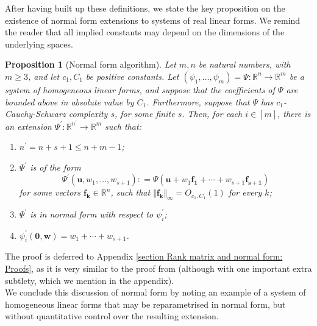 \documentclass[12pt,a4paper,twoside,reqno]{amsart}
\newtheorem{Proposition}[Theorem]{Proposition}
\numberwithin{equation}{section}
\begin{document}
After having built up these definitions, we state the key proposition on the existence of normal form extensions to systems of real linear forms. We remind the reader that all implied constants may depend on the dimensions of the underlying spaces. 

\begin{Proposition}[Normal form algorithm]
\label{normal form algorithm}
Let $m,n$ be natural numbers, with $m\geqslant 3$, and let $c_1,C_1$ be positive constants. Let $(\psi_1,\dots,\psi_m) = \Psi:\mathbb{R}^n \longrightarrow \mathbb{R}^m$ be a system of homogeneous linear forms, and suppose that the coefficients of $\Psi$ are bounded above in absolute value by $C_1$. Furthermore, suppose that $\Psi$ has $c_1$-Cauchy-Schwarz complexity $s$, for some finite $s$. Then, for each $i \in [m]$, there is an extension $\Psi^\prime:\mathbb{R}^{n^\prime}\longrightarrow \mathbb{R}^m$ such that:
\begin{enumerate}[(1)]
\item $n^\prime = n+s+1 \leqslant n+m-1$; 
\item $\Psi^\prime$ is of the form $$\Psi^\prime(\mathbf{u}, w_1,\dots,w_{s+1}): = \Psi(\mathbf{u} + w_1\mathbf{f_1}+ \cdots + w_{s+1}\mathbf{f_{s+1}})$$ for some vectors $\mathbf{f_k}\in \mathbb{R}^n$, such that $\Vert \mathbf{f_k}\Vert_\infty=O_{c_1,C_1}(1)$ for every $k$;
\item $\Psi^\prime$ is in normal form with respect to $\psi_i^\prime$;
\item $\psi_i^\prime(\mathbf{0},\mathbf{w}) = w_1 + \cdots + w_{s+1}$.
\end{enumerate}
\end{Proposition}
\noindent The proof is deferred to Appendix \ref{section Rank matrix and normal form: Proofs}, as it is very similar to the proof from \cite{GT10} (although with one important extra subtlety, which we mention in the appendix). \\

We conclude this discussion of normal form by noting an example of a system of homogeneous linear forms that may be reparametrised in normal form, but without quantitative control over the resulting extension. 
\end{document}
